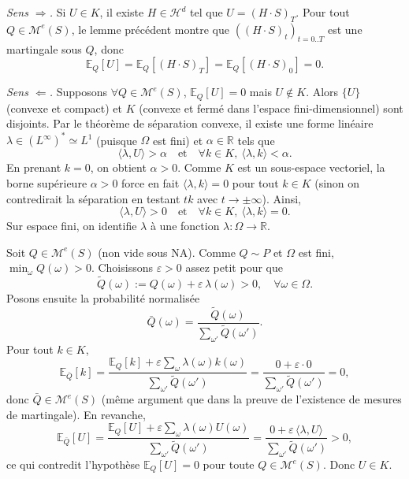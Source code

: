 \documentclass[12pt,a4paper]{article}
\makeatletter
\numberwithin{equation}{section}
\theoremstyle{plain} %
\theoremstyle{definition} %
\theoremstyle{remark} %
\theoremstyle{myexample}
\theoremstyle{definition}
\renewenvironment{proof}[1][\proofname]{%
  \par\vspace{0.8em}%
  \pushQED{\qed}%
  \normalfont\color{cyan}%
  \topsep6\p@\@plus6\p@\relax
  \trivlist
  \item[\hskip\labelsep\bfseries\color{cyan}#1\@addpunct{.}]\ignorespaces
}{%
  \popQED\endtrivlist\vspace{0.8em}%
}
\newcommand{\E}{\mathbb{E}}
\newcommand{\RR}{\mathbb{R}}
\makeatother
\begin{document}
\begin{proof}
\emph{Sens $\Rightarrow$.} Si $U\in K$, il existe $H\in\mathcal{H}^d$ tel que $U=(H\cdot S)_T$. Pour tout $Q\in\mathcal{M}^e(S)$, le lemme précédent montre que $((H\cdot S)_t)_{t=0..T}$ est une martingale sous $Q$, donc
\[
\E_Q[U]=\E_Q[(H\cdot S)_T]=\E_Q[(H\cdot S)_0]=0.
\]

\smallskip
\emph{Sens $\Leftarrow$.} Supposons $\forall Q\in\mathcal{M}^e(S)$, $\E_Q[U]=0$ mais $U\notin K$.  
Alors $\{U\}$ (convexe et compact) et $K$ (convexe et fermé dans l’espace fini-dimensionnel) sont disjoints. Par le théorème de séparation convexe, il existe une forme linéaire $\lambda\in (L^\infty)^*\simeq L^1$ (puisque $\Omega$ est fini) et $\alpha\in\RR$ tels que
\[
\langle \lambda,U\rangle>\alpha \quad\text{et}\quad \forall k\in K,\ \langle \lambda,k\rangle<\alpha.
\]
En prenant $k=0$, on obtient $\alpha>0$. Comme $K$ est un sous-espace vectoriel, la borne supérieure $\alpha>0$ force en fait $\langle\lambda,k\rangle=0$ pour tout $k\in K$ (sinon on contredirait la séparation en testant $tk$ avec $t\to\pm\infty$). Ainsi,
\[
\langle \lambda,U\rangle>0
\quad\text{et}\quad
\forall k\in K,\ \langle \lambda,k\rangle=0.
\]
Sur espace fini, on identifie $\lambda$ à une fonction $\lambda:\Omega\to\RR$.

Soit $Q\in\mathcal{M}^e(S)$ (non vide sous NA). Comme $Q\sim P$ et $\Omega$ est fini, $\min_{\omega}Q(\omega)>0$. Choisissons $\varepsilon>0$ assez petit pour que
\[
\widetilde Q(\omega):=Q(\omega)+\varepsilon\,\lambda(\omega)>0,\quad \forall \omega\in\Omega.
\]
Posons ensuite la probabilité normalisée
\[
\bar Q(\omega)=\frac{\widetilde Q(\omega)}{\sum_{\omega'} \widetilde Q(\omega')}.
\]
Pour tout $k\in K$,
\[
\E_{\bar Q}[k]
=\frac{\E_Q[k]+\varepsilon \sum_{\omega}\lambda(\omega)k(\omega)}{\sum_{\omega'} \widetilde Q(\omega')}
=\frac{0+\varepsilon\cdot 0}{\sum_{\omega'} \widetilde Q(\omega')}=0,
\]
donc $\bar Q\in\mathcal{M}^e(S)$ (même argument que dans la preuve de l’existence de mesures de martingale). En revanche,
\[
\E_{\bar Q}[U]
=\frac{\E_Q[U]+\varepsilon\sum_{\omega}\lambda(\omega)U(\omega)}{\sum_{\omega'} \widetilde Q(\omega')}
=\frac{0+\varepsilon\,\langle\lambda,U\rangle}{\sum_{\omega'} \widetilde Q(\omega')}>0,
\]
ce qui contredit l’hypothèse $\E_Q[U]=0$ pour toute $Q\in\mathcal{M}^e(S)$. Donc $U\in K$.
\end{proof}
\end{document}
